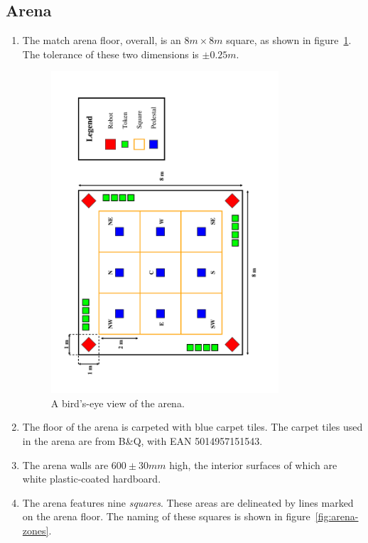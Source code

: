 \subsection{Arena}
\label{sub:arena}
\begin{enumerate}
\item The match arena floor, overall, is an $8m \times 8m$ square, as shown in figure~\ref{fig:arena-dim}.
      The tolerance of these two dimensions is $\pm0.25m$.

\begin{figure}
  \centering
  \includegraphics[width=0.8\textwidth]{./images/arena.pdf}
  \caption{\label{fig:arena-dim}A bird's-eye view of the arena.}
\end{figure}

\item The floor of the arena is carpeted with blue carpet tiles.
      The carpet tiles used in the arena are from B\&Q, with EAN 5014957151543.

\item The arena walls are $600\pm30mm$ high, the interior surfaces of which are white plastic-coated hardboard.

\item The arena features nine \textit{squares}.
      These areas are delineated by lines marked on the arena floor.
      The naming of these squares is shown in figure~\ref{fig:arena-zones}.


\end{enumerate}

